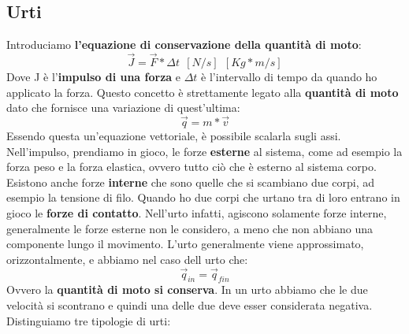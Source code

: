 \documentclass{article}
\numberwithin{equation}{subsection}
\begin{document}
\subsection{Urti}
Introduciamo \textbf{l'equazione di conservazione della quantità di moto}:
\begin{equation}
    \vec{J}=\vec{F}*\Delta t \ \  [N/s] \ \ [Kg *m/s]
\end{equation}
Dove J è l'\textbf{impulso di una forza} e $\Delta t$ è l'intervallo di tempo da quando ho applicato la forza. Questo concetto è strettamente legato alla \textbf{quantità di moto} dato che fornisce una variazione di quest'ultima:
\begin{equation}
    \vec{q}=m*\vec{v}
\end{equation}
Essendo questa un'equazione vettoriale, è possibile scalarla sugli assi. Nell'impulso, prendiamo in gioco, le forze \textbf{esterne} al sistema, come ad esempio la forza peso e la forza elastica, ovvero tutto ciò che è esterno al sistema corpo. Esistono anche forze \textbf{interne} che sono quelle che si scambiano due corpi, ad esempio la tensione di filo. Quando ho due corpi che urtano tra di loro entrano in gioco le \textbf{forze di contatto}. Nell'urto infatti, agiscono solamente forze interne, generalmente le forze esterne non le considero, a meno che non abbiano una componente lungo il movimento. L'urto generalmente viene approssimato, orizzontalmente, e abbiamo nel caso dell urto che:
\begin{equation}
    \vec{q}_{in}=\vec{q}_{fin}
\end{equation}
Ovvero la \textbf{quantità di moto si conserva}. In un urto abbiamo che le due velocità si scontrano e quindi una delle due deve esser considerata negativa. Distinguiamo tre tipologie di urti:
\end{document}
